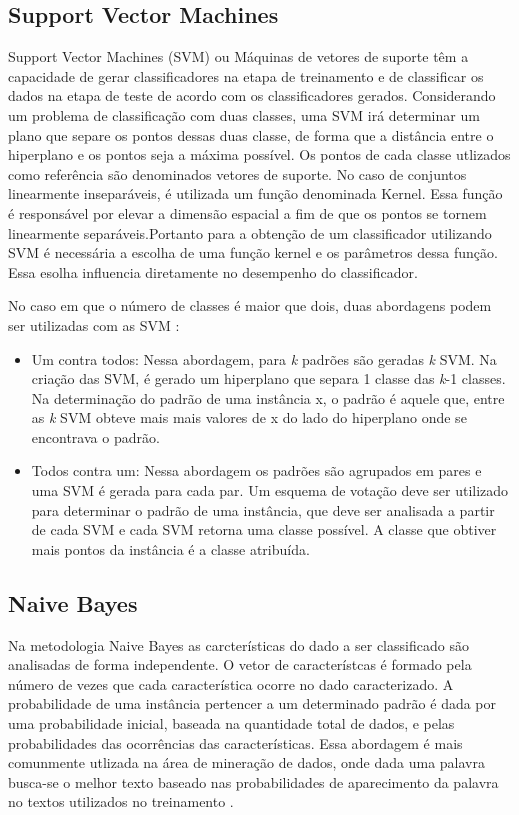 \subsection{Support Vector Machines}
Support Vector Machines (SVM) ou Máquinas de vetores de suporte têm a capacidade de gerar classificadores na etapa de treinamento e de classificar os dados na etapa de teste de acordo com os classificadores gerados. Considerando um problema de classificação com duas classes, uma SVM irá determinar um plano que separe os pontos dessas duas classe, de forma que a distância entre o hiperplano e os pontos seja a máxima possível. Os pontos de cada classe utlizados como referência são denominados vetores de suporte.
No caso de conjuntos linearmente inseparáveis, é utilizada um função denominada Kernel. Essa função é responsável por elevar a dimensão espacial a fim de que os pontos se tornem linearmente separáveis.Portanto para a obtenção de um classificador utilizando SVM é necessária a escolha de uma função kernel e os parâmetros dessa função. Essa esolha influencia diretamente no desempenho do classificador\cite{Gunn98SVM}\cite{Reffson02SVM}.

No caso em que o número de classes é maior que dois, duas abordagens podem ser utilizadas com as SVM \cite{Lorena03SVM}:
\begin{itemize}
\item{Um contra todos: }Nessa abordagem, para \textit{k} padrões são geradas \textit{k} SVM. Na criação das SVM, é gerado um hiperplano que separa 1 classe das \textit{k}-1 classes. Na determinação do padrão de uma instância x, o padrão é aquele que, entre as \textit{k} SVM obteve mais mais valores de x do lado do hiperplano onde se encontrava o padrão.  
\item{Todos contra um: }Nessa abordagem os padrões são agrupados em pares e uma SVM é gerada para cada par. Um esquema de votação deve ser utilizado para determinar o padrão de uma instância, que deve ser analisada a partir de cada SVM e cada SVM retorna uma classe possível. A classe que obtiver mais pontos da instância é a classe atribuída.
\end{itemize}

\subsection{Naive Bayes}
Na metodologia Naive Bayes as carcterísticas do dado a ser classificado são analisadas de forma independente. O vetor de característcas é formado pela número de vezes que cada característica ocorre no dado caracterizado. A probabilidade de uma instância pertencer a um determinado padrão é dada por uma probabilidade inicial, baseada na quantidade total de dados, e pelas probabilidades das ocorrências das características. Essa abordagem é mais comunmente utlizada na área de mineração de dados, onde dada uma palavra busca-se o melhor texto baseado nas probabilidades de aparecimento da palavra no textos utilizados no treinamento \cite{McCallum98Bayes}\cite{Langley92Bayes}.

